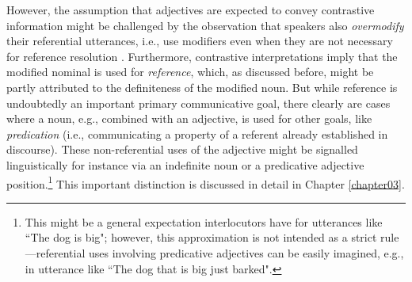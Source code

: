However, the assumption that adjectives are expected to convey contrastive information might be challenged by the observation that speakers also \textit{overmodify} their referential utterances, i.e., use modifiers even when they are not necessary for reference resolution \parencite{degen2020redundancy}.  Furthermore, contrastive interpretations imply that the modified nominal is used for \textit{reference}, which, as discussed before, might be partly attributed to the definiteness of the modified noun. But while reference is undoubtedly an important primary communicative goal, there clearly are cases where a noun, e.g., combined with an adjective, is used for other goals, like \textit{predication} (i.e., communicating a property of a referent already established in discourse). These non-referential uses of the adjective might be signalled linguistically for instance via an indefinite noun or a predicative adjective position.\footnote{This might be a general expectation interlocutors have for utterances like ``The dog is big"; however, this approximation is not intended as a strict rule---referential uses involving predicative adjectives can be easily imagined, e.g., in utterance like ``The dog that is big just barked".}   %
This important distinction is discussed in detail in Chapter \ref{chapter03}.  

